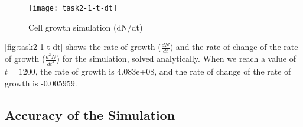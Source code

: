 \begin{figure}[ht]
    \centering
    \texttt{[image: task2-1-t-dt]}
    \caption[Cell growth simulation (dN/dt)]{Cell growth simulation (dN/dt)}
    \label{fig:task2-1-t-dt}
\end{figure}









\autoref{fig:task2-1-t-dt} shows the rate of growth ($\frac{dN}{dt}$) and the rate of change of the rate of growth ($\frac{d^2N}{dt^2}$) for the simulation, solved analytically.
When we reach a value of $t = 1200$, the rate of growth is 4.083e+08, and the rate of change of the rate of growth is -0.005959.

\clearpage

\subsection{Accuracy of the Simulation}

